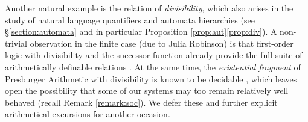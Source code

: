 \documentclass[12pt,oneside,reqno]{amsart}
\theoremstyle{definition}
\begin{document}
Another natural example is the relation of \emph{divisibility}, which also arises in the study of natural language quantifiers and automata hierarchies (see \S\ref{section:automata} and in particular Proposition \ref{prop:aut}\ref{prop:div}). A non-trivial observation in the finite case (due to Julia Robinson) is that first-order logic with divisibility and the successor function already provide the full suite of arithmetically definable relations \citep{Robinson}. At the same time, the \emph{existential fragment} of Presburger Arithmetic with divisibility is known to be decidable \citep{Lipschitz}, which leaves open the possibility that some of our systems may too remain relatively well behaved (recall Remark \ref{remark:soc}). We defer these and further explicit arithmetical excursions for another occasion. 

\end{document}
